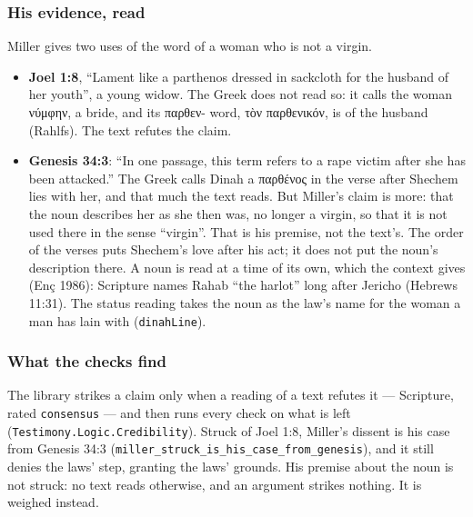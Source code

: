 \documentclass[11pt]{article}
\begin{document}
\subsubsection*{His evidence, read}
Miller gives two uses of the word of a woman who is not a virgin.

\begin{itemize}
  \item \textbf{Joel 1:8}, “Lament like a parthenos dressed in sackcloth for the husband of her youth”, a young widow. The Greek does not read so: it calls the woman νύμφην, a bride, and its παρθεν- word, τὸν παρθενικόν, is of the husband (Rahlfs). The text refutes the claim.
  \item \textbf{Genesis 34:3}: “In one passage, this term refers to a rape victim after she has been attacked.” The Greek calls Dinah a παρθένος in the verse after Shechem lies with her, and that much the text reads. But Miller’s claim is more: that the noun describes her as she then was, no longer a virgin, so that it is not used there in the sense “virgin”. That is his premise, not the text’s. The order of the verses puts Shechem’s love after his act; it does not put the noun’s description there. A noun is read at a time of its own, which the context gives (Enç 1986): Scripture names Rahab “the harlot” long after Jericho (Hebrews 11:31). The status reading takes the noun as the law’s name for the woman a man has lain with (\texttt{dinah\allowbreak{}Line}).
\end{itemize}
\subsubsection*{What the checks find}
The library strikes a claim only when a reading of a text refutes it — Scripture, rated \texttt{consensus} — and then runs every check on what is left (\texttt{Testimony.Logic.Credibility}). Struck of Joel 1:8, Miller’s dissent is his case from Genesis 34:3 (\texttt{miller\_\allowbreak{}struck\_\allowbreak{}is\_\allowbreak{}his\_\allowbreak{}case\_\allowbreak{}from\_\allowbreak{}genesis}), and it still denies the laws’ step, granting the laws’ grounds. His premise about the noun is not struck: no text reads otherwise, and an argument strikes nothing. It is weighed instead.
\end{document}
